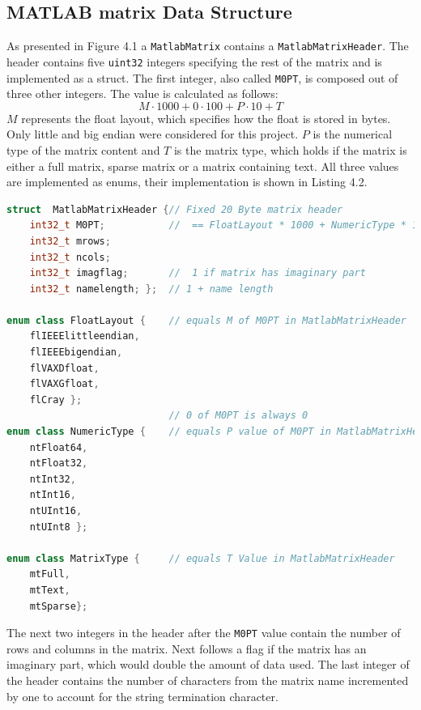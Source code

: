 \subsection{MATLAB matrix Data Structure}
As presented in Figure 4.1 a \texttt{MatlabMatrix} contains a \texttt{MatlabMatrixHeader}. The header contains five \texttt{uint32} integers specifying the rest of the matrix and is implemented as a struct. The first integer, also called \texttt{M0PT}, is composed out of three other integers. The value is calculated as follows:
$$M\cdot1000 + 0 \cdot 100 + P\cdot 10 + T$$
$M$ represents the float layout, which specifies how the float is stored in bytes. Only little and big endian were considered for this project. $P$ is the numerical type of the matrix content and $T$ is the matrix type, which holds if the matrix is either a full matrix, sparse matrix or a matrix containing text. All three values are implemented as enums, their implementation is shown in Listing 4.2.
\vspace{1em}
\begin{lstlisting}[language=C++, caption=A code snippet showing the used enums and structs in the MATLAB header.]
struct  MatlabMatrixHeader {// Fixed 20 Byte matrix header
    int32_t M0PT;  			//  == FloatLayout * 1000 + NumericType * 10 + MatrixType
    int32_t mrows;
    int32_t ncols;
    int32_t imagflag;   	//  1 if matrix has imaginary part
    int32_t namelength; }; 	// 1 + name length

enum class FloatLayout {  	// equals M of M0PT in MatlabMatrixHeader
    flIEEElittleendian,
    flIEEEbigendian,
    flVAXDfloat,
    flVAXGfloat,
    flCray };
							// 0 of M0PT is always 0
enum class NumericType { 	// equals P value of M0PT in MatlabMatrixHeader
    ntFloat64,
    ntFloat32,
    ntInt32,
    ntInt16,
    ntUInt16,
    ntUInt8 };

enum class MatrixType {  	// equals T Value in MatlabMatrixHeader
    mtFull,
    mtText,
    mtSparse};
\end{lstlisting}
\pagebreak
The next two integers in the header after the \texttt{M0PT} value contain the number of rows and columns in the matrix. Next follows a flag if the matrix has an imaginary part, which would double the amount of data used. The last integer of the header contains the number of characters from the matrix name incremented by one to account for the string termination character.


